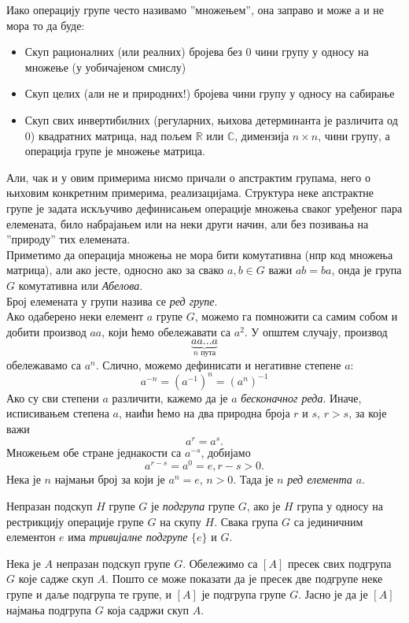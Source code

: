 \documentclass{report}
\theoremstyle{plain}
\theoremstyle{definition}
\begin{document}
Иако операцију групе често називамо ''множењем'', она заправо и може а и не мора то да буде:
\begin{itemize}
  \item Скуп рационалних (или реалних) бројева без $0$ чини групу у односу на множење (у уобичајеном смислу)
  \item Скуп целих (али не и природних!) бројева чини групу у односу на сабирање
  \item Скуп свих инвертибилних (регуларних, њихова детерминанта је различита од $0$) квадратних матрица, над пољем $\mathbb{R}$ или $\mathbb{C}$, димензија $n\times n$, чини групу, а операција групе је множење матрица.
\end{itemize}
Али, чак и у овим примерима нисмо причали о апстрактим групама, него о њиховим конкретним примерима, реализацијама. Структура неке апстрактне групе је задата искључиво дефинисањем операције множења сваког уређеног пара елемената, било набрајањем или на неки други начин, али без позивања на ''природу'' тих елемената.\\
Приметимо да операција множења не мора бити комутативна (нпр код множења матрица), али ако јесте, односно ако за свако $a, b\in G$ важи $ab = ba$, онда је група $G$ комутативна или \emph{Абелова}.\\
Број елемената у групи назива се \emph{ред групе}.\\
Ако одаберено неки елемент $a$ групе $G$, можемо га помножити са самим собом и добити производ $aa$, који ћемо обележавати са $a^2$. У општем случају, производ $$\underbrace{aa...a}_{n\text{ пута}}$$ обележавамо са $a^n$. Слично, можемо дефинисати и негативне степене $a$:
$$a^{-n} = (a^{-1})^n = (a^n)^{-1}$$
Ако су сви степени $a$ различити, кажемо да је $a$ \emph{бесконачног реда}. Иначе, исписивањем степена $a$, наићи ћемо на два природна броја $r$ и $s$, $r>s$, за које важи
$$a^r = a^s.$$
Множењем обе стране једнакости са $a^{-s}$, добијамо
$$a^{r-s} = a^0 = e, r-s>0.$$
Нека је $n$ најмањи број за који је $a^n = e$, $n>0$. Тада је $n$ \emph{ред елемента $a$}.

Непразан подскуп $H$ групе $G$ је \emph{подгрупа} групе $G$, ако је $H$ група у односу на рестрикцију операције групе $G$ на скупу $H$. Свака група $G$ са јединичним елементон $e$ има \emph{тривијалне подгрупе} $\{e\}$ и $G$.

Нека је $A$ непразан подскуп групе $G$. Обележимо са $[A]$ пресек свих подгрупа $G$ које садже скуп $A$. Пошто се може показати да је пресек две подгрупе неке групе и даље подгрупа те групе, и $[A]$ је подгрупа групе $G$. Јасно је да је $[A]$ најмања подгрупа $G$ која садржи скуп $A$.
\end{document}
